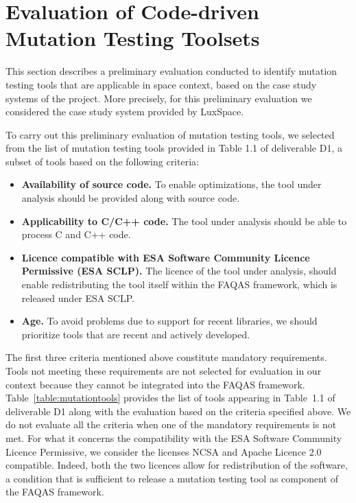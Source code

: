 \clearpage
\section{Evaluation of Code-driven Mutation Testing Toolsets}
\label{sec:toolsComparison}

This section describes a preliminary evaluation conducted to identify mutation testing tools that are applicable in space context, based on the case study systems of the project. More precisely, for this preliminary evaluation we considered the case study system provided by LuxSpace.

To carry out this preliminary evaluation of mutation testing tools, we selected from the list of mutation testing tools provided in Table 1.1 of deliverable D1, a subset of tools based on the following criteria:

\begin{itemize}
	\item \textbf{Availability of source code.} To enable optimizations, the tool under analysis should be provided along with source code.
	\item \textbf{Applicability to C/C++ code.} The tool under analysis should be able to process C and C++ code.
	\item \textbf{Licence compatible with ESA Software Community Licence Permissive (ESA SCLP).} The licence of the tool under analysis, should enable redistributing the tool itself within the FAQAS framework, which is released under ESA SCLP.
	\item \textbf{Age.} To avoid problems due to support for recent libraries, we should prioritize tools that are recent and actively developed.
\end{itemize}




The first three criteria mentioned above constitute mandatory requirements. 
Tools not meeting these requirements are not selected for evaluation in our context because they cannot be integrated into the FAQAS framework.
Table~\ref{table:mutationtools} provides the list of tools appearing in Table~1.1 of deliverable D1 along with the evaluation based on the criteria specified above. We do not evaluate all the criteria when one of the mandatory requirements is not met.
For what it concerns the compatibility with the ESA Software Community Licence Permissive, we consider the licenses NCSA and Apache Licence 2.0 compatible. 
Indeed, both the two licences allow for redistribution of the software, a condition that is sufficient to release a mutation testing tool as component of the FAQAS framework.

